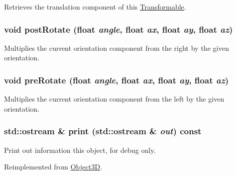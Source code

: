 Retrieves the translation component of this \hyperlink{classm3g_1_1Transformable}{Transformable}. \hypertarget{classm3g_1_1Transformable_4abf135257f132cdf9580f3a3e11ea6c}{
\subsubsection[{postRotate}]{\setlength{\rightskip}{0pt plus 5cm}void postRotate (float {\em angle}, \/  float {\em ax}, \/  float {\em ay}, \/  float {\em az})}}
\label{classm3g_1_1Transformable_4abf135257f132cdf9580f3a3e11ea6c}


Multiplies the current orientation component from the right by the given orientation. \hypertarget{classm3g_1_1Transformable_718b606184672eec83263ad44d5c7431}{
\subsubsection[{preRotate}]{\setlength{\rightskip}{0pt plus 5cm}void preRotate (float {\em angle}, \/  float {\em ax}, \/  float {\em ay}, \/  float {\em az})}}
\label{classm3g_1_1Transformable_718b606184672eec83263ad44d5c7431}


Multiplies the current orientation component from the left by the given orientation. \hypertarget{classm3g_1_1Transformable_6fea17fa1532df3794f8cb39cb4f911f}{
\subsubsection[{print}]{\setlength{\rightskip}{0pt plus 5cm}std::ostream \& print (std::ostream \& {\em out}) const}}
\label{classm3g_1_1Transformable_6fea17fa1532df3794f8cb39cb4f911f}


Print out information this object, for debug only. 

Reimplemented from \hyperlink{classm3g_1_1Object3D_6fea17fa1532df3794f8cb39cb4f911f}{Object3D}.

